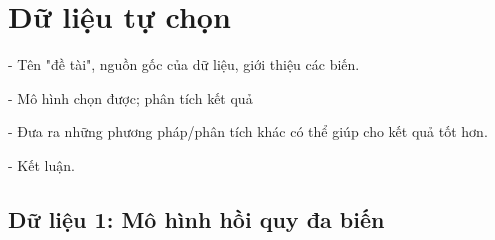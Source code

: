 \chapter{Dữ liệu tự chọn}
- Tên "đề tài", nguồn gốc của dữ liệu, giới thiệu các biến.

- Mô hình chọn được; phân tích kết quả

- Đưa ra những phương pháp/phân tích khác có thể giúp cho kết quả tốt hơn.

- Kết luận.

\section{Dữ liệu 1: Mô hình hồi quy đa biến}